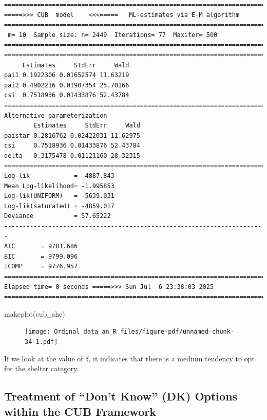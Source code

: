 \documentclass[
  letterpaper,
  DIV=11,
  numbers=noendperiod]{scrartcl}
\newenvironment{Shaded}{\begin{snugshade}}{\end{snugshade}}
\newcommand{\FunctionTok}[1]{\textcolor[rgb]{0.28,0.35,0.67}{#1}}
\newcommand{\NormalTok}[1]{\textcolor[rgb]{0.00,0.23,0.31}{#1}}
\begin{document}
\begin{verbatim}
======================================================================= 
=====>>> CUB  model    <<<=====   ML-estimates via E-M algorithm   
======================================================================= 
 m= 10  Sample size: n= 2449  Iterations= 77  Maxiter= 500 
======================================================================= 
======================================================================= 
     Estimates     StdErr     Wald
pai1 0.1922306 0.01652574 11.63219
pai2 0.4902216 0.01907354 25.70166
csi  0.7518936 0.01433876 52.43784
======================================================================= 
Alternative parameterization 
        Estimates     StdErr     Wald
paistar 0.2816762 0.02422031 11.62975
csi     0.7518936 0.01433876 52.43784
delta   0.3175478 0.01121160 28.32315
======================================================================= 
Log-lik            = -4887.843 
Mean Log-likelihood= -1.995853 
Log-lik(UNIFORM)   = -5639.031 
Log-lik(saturated) = -4859.017 
Deviance           = 57.65222 
----------------------------------------------------------------------- 
AIC       = 9781.686 
BIC       = 9799.096 
ICOMP     = 9776.957 
======================================================================= 
Elapsed time= 0 seconds =====>>> Sun Jul  6 23:38:03 2025 
======================================================================= 
\end{verbatim}

\begin{Shaded}
\begin{Highlighting}[]
\FunctionTok{makeplot}\NormalTok{(cub\_she)}
\end{Highlighting}
\end{Shaded}

\begin{figure}[H]

{\centering \texttt{[image: Ordinal\_data\_an\_R\_files/figure-pdf/unnamed-chunk-34-1.pdf]}

}

\end{figure}

If we look at the value of \(\delta\), it indicates that there is a
medium tendency to opt for the shelter category.

\hypertarget{treatment-of-dont-know-dk-options-within-the-cub-framework}{%
\subsection{Treatment of ``Don't Know'' (DK) Options within the CUB
Framework}\label{treatment-of-dont-know-dk-options-within-the-cub-framework}}
\end{document}
